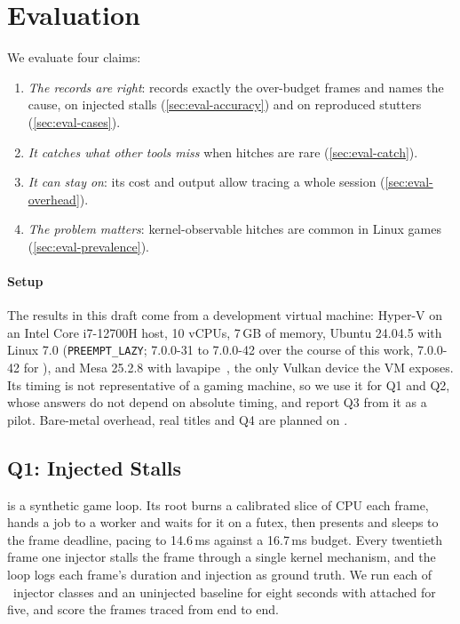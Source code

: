 \section{Evaluation}
\label{sec:eval}

We evaluate four claims:
\begin{enumerate}[\bfseries {Q}1]
\item \emph{The records are right}: \sys records exactly the over-budget
  frames and names the cause, on injected stalls
  (\autoref{sec:eval-accuracy}) and on reproduced stutters
  (\autoref{sec:eval-cases}).
\item \emph{It catches what other tools miss} when hitches are rare
  (\autoref{sec:eval-catch}).
\item \emph{It can stay on}: its cost and output allow tracing a whole
  session (\autoref{sec:eval-overhead}).
\item \emph{The problem matters}: kernel-observable hitches are common in
  Linux games (\autoref{sec:eval-prevalence}).
\end{enumerate}

\paragraph{Setup} The results in this draft come from a development virtual
machine: Hyper-V on an Intel Core i7-12700H host, 10 vCPUs, 7\,GB of memory,
Ubuntu 24.04.5 with Linux 7.0 (\texttt{PREEMPT\_LAZY}; 7.0.0-31 to 7.0.0-42
over the course of this work, 7.0.0-42 for \bench), and Mesa 25.2.8 with
lavapipe~\cite{lavapipe}, the only Vulkan device the VM exposes. Its timing
is not representative of a gaming machine, so we use it for Q1 and Q2,
whose answers do not depend on absolute timing, and report Q3 from it as a
pilot. Bare-metal overhead, real titles and Q4 are planned on
.

\subsection{Q1: Injected Stalls}
\label{sec:eval-accuracy}

\bench is a synthetic game loop. Its root burns a calibrated slice of CPU
each frame, hands a job to a worker and waits for it on a futex, then
presents and sleeps to the frame deadline, pacing to 14.6\,ms against a
16.7\,ms budget. Every twentieth frame one injector stalls the frame
through a single kernel mechanism, and the loop logs each frame's duration
and injection as ground truth. We run each of \hbnClasses\ injector classes
and an uninjected baseline for eight seconds with \sys attached for five,
and score the frames traced from end to end.

